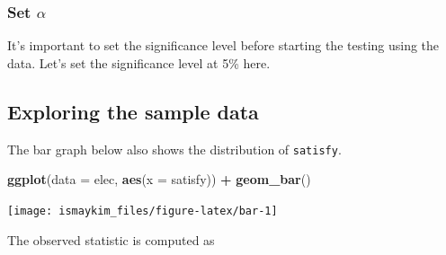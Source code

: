 \documentclass[12pt, krantz2,]{krantz}
\makeatletter
\newenvironment{Shaded}{\begin{snugshade}}{\end{snugshade}}
\newcommand{\DataTypeTok}[1]{\textcolor[rgb]{0.27,0.27,0.27}{#1}}
\newcommand{\DecValTok}[1]{\textcolor[rgb]{0.06,0.06,0.06}{#1}}
\newcommand{\KeywordTok}[1]{\textcolor[rgb]{0.27,0.27,0.27}{\textbf{#1}}}
\newcommand{\NormalTok}[1]{#1}
\newcommand{\OperatorTok}[1]{\textcolor[rgb]{0.43,0.43,0.43}{\textbf{#1}}}
\newcommand{\StringTok}[1]{\textcolor[rgb]{0.5,0.5,0.5}{#1}}
\newenvironment{kframe}{%
\medskip{}
\setlength{\fboxsep}{.8em}
 \def\at@end@of@kframe{}%
 \ifinner\ifhmode%
  \def\at@end@of@kframe{\end{minipage}}%
  \begin{minipage}{\columnwidth}%
 \fi\fi%
 \def\FrameCommand##1{\hskip\@totalleftmargin \hskip-\fboxsep
 \colorbox{shadecolor}{##1}\hskip-\fboxsep
     \hskip-\linewidth \hskip-\@totalleftmargin \hskip\columnwidth}%
 \MakeFramed {\advance\hsize-\width
   \@totalleftmargin\z@ \linewidth\hsize
   \@setminipage}}%
 {\par\unskip\endMakeFramed%
 \at@end@of@kframe}
\renewenvironment{Shaded}{\begin{kframe}}{\end{kframe}}
\makeatother
\begin{document}
\hypertarget{set-alpha-1}{%
\subsubsection*{\texorpdfstring{Set \(\alpha\)}{Set \textbackslash{}alpha}}\label{set-alpha-1}}


It's important to set the significance level before starting the testing using the data. Let's set the significance level at 5\% here.

\hypertarget{exploring-the-sample-data-1}{%
\subsection{Exploring the sample data}\label{exploring-the-sample-data-1}}

\begin{Shaded}
\end{Shaded}

The bar graph below also shows the distribution of \texttt{satisfy}.

\begin{Shaded}
\begin{Highlighting}[]
\KeywordTok{ggplot}\NormalTok{(}\DataTypeTok{data =}\NormalTok{ elec, }\KeywordTok{aes}\NormalTok{(}\DataTypeTok{x =}\NormalTok{ satisfy)) }\OperatorTok{+}\StringTok{ }
\StringTok{  }\KeywordTok{geom_bar}\NormalTok{()}
\end{Highlighting}
\end{Shaded}

\begin{center}\texttt{[image: ismaykim\_files/figure-latex/bar-1]} \end{center}

The observed statistic is computed as

\begin{Shaded}
\end{Shaded}
\end{document}
